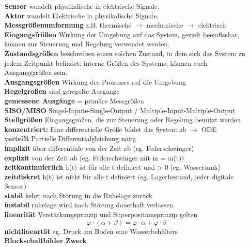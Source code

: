 \documentclass{article}
\begin{document}
\begin{multicols}{6}
\textbf{Sensor} wandelt physikalische in elektrische Signale.
\\
\textbf{Aktor} wandelt Elektrische in physikalische Signale.
\\
\textbf{Messgrößenumformung} z.B. thermische $\rightarrow$ mechanische $\rightarrow$ elektrisch \\
\textbf{Eingangsfrößen} Wirkung der Umgebung auf das System, gezielt beeinflssbar, können zur Steuerung und Regelung verwendet werden. 
\\
\textbf{Zustandsgrößen} beschreiben einen solchen Zustand, in dem sich das Svstem zu jedem Zeitpunkt befindet: interne Größen des Systems; können auch Ausgangsgrößen sein.  
\\
\textbf{Ausgangsgrößen} Wirkung des Prozesses auf die  Umgebung 
\\
\textbf{Regelgroßen} sind geregelte Ausgange 
\\
\textbf{gemessene Ausgänge} = primäre Messgrößen 
\\
\textbf{SISO/MISO} Singel-Inpute-Single-Output / Multiple-Input-Multiple-Output 
\\
\textbf{Stellgrößen} Eingangsgrößen, die zur Steuerung oder Regelung benutzt werden
\\
\textbf{konzentriert:} Eine differentielle Größe bildet das System ab $\rightarrow$ ODE
\\
\textbf{verteilt} Partielle Differentialgleichung nötig
\\
\textbf{implizit} über differentiale von der Zeit ab (eg. Federschwinger)
\\
\textbf{explizit} von der Zeit ab (eg. Federschwinger mit m = m(t))
\\
\textbf{zeitkontinuierlich} h(t) ist für alle t definiert und > 0 (eg. Wassertank)
\\
\textbf{zeitdiskret} h(t) ist nicht für alle t definiert (eg. Lagerbestand, jeder digitale Sensor)
\\
\textbf{stabil} kehrt nach Störung in die Ruhelage zurück
\\
\textbf{instabil} ruhelage wird nach Störung dauerhaft verlassen
\\
\textbf{linearität} Verstärkungsprinzip und Superpositionsprinzip gelten 
\begin{equation*}
\varphi \cdot (\alpha + \beta) = \varphi \cdot \alpha + \varphi \cdot \beta
\end{equation*}
\textbf{nichtlineartät} eg. Druck am Boden eine Wasserbehälters
\\
\textbf{Blockschaltbilder Zweck} 

\end{multicols}
\end{document}
